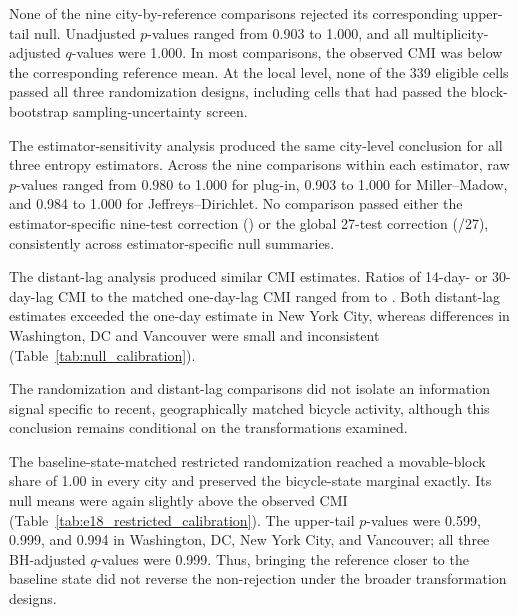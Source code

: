 None of the nine city-by-reference comparisons rejected its corresponding
upper-tail null. Unadjusted \(p\)-values ranged from 0.903 to 1.000, and all
multiplicity-adjusted \(q\)-values were 1.000. In most comparisons, the observed CMI was below
the corresponding reference mean. At the local level, none of the 339
eligible cells passed all three randomization designs, including cells
that had passed the block-bootstrap sampling-uncertainty screen.

The estimator-sensitivity analysis produced the same city-level conclusion
for all three entropy estimators. Across the nine comparisons within each estimator, raw
\(p\)-values ranged from 0.980 to 1.000 for plug-in, 0.903 to 1.000 for
Miller--Madow, and 0.984 to 1.000 for Jeffreys--Dirichlet. No comparison
passed either the estimator-specific nine-test correction
() or the global 27-test correction
(\ESeventeenGlobalRejects{}/27), consistently across estimator-specific null
summaries.

The distant-lag analysis produced similar CMI estimates. Ratios of
14-day- or 30-day-lag CMI to the matched one-day-lag CMI ranged from
\DistantRatioMin{} to \DistantRatioMax{}. Both distant-lag estimates
exceeded the one-day estimate in New York City, whereas differences
in Washington, DC and Vancouver were small and inconsistent
(Table~\ref{tab:null_calibration}).


The randomization and distant-lag comparisons did not isolate an information
signal specific to recent, geographically matched bicycle activity, although
this conclusion remains conditional on the transformations examined.



The baseline-state-matched restricted randomization reached a movable-block
share of 1.00 in every city and preserved the bicycle-state marginal
exactly. Its null means were again slightly above the observed CMI
(Table~\ref{tab:e18_restricted_calibration}). The upper-tail \(p\)-values
were 0.599, 0.999, and 0.994 in Washington, DC, New York City, and
Vancouver; all three BH-adjusted \(q\)-values were 0.999. Thus, bringing
the reference closer to the baseline state did not reverse the
non-rejection under the broader transformation designs.

